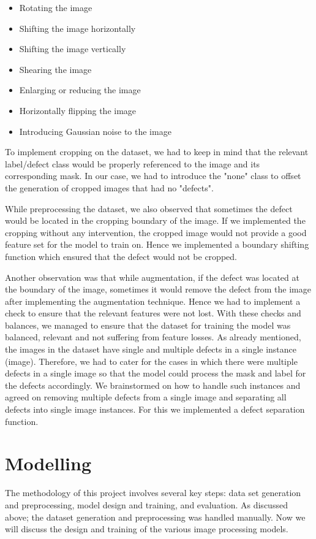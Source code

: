 \documentclass[12pt]{article}
\begin{document}
\begin{itemize}
    \item Rotating the image 
    \item Shifting the image horizontally  
    \item Shifting the image vertically  
    \item Shearing the image
    \item Enlarging or reducing  the image
    \item Horizontally flipping the image 
    \item Introducing Gaussian noise to the image
\end{itemize}

To implement cropping on the dataset, we had to keep in mind that the relevant label/defect class would be properly referenced to the image and its corresponding mask. In our case, we had to introduce the "none" class to offset the generation of cropped images that had no "defects".

While preprocessing the dataset, we also observed that sometimes the defect would be located in the cropping boundary of the image. If we implemented the cropping without any intervention, the cropped image would not provide a good feature set for the model to train on. Hence we implemented a boundary shifting function which ensured that the defect would not be cropped.

Another observation was that while augmentation, if the defect was located at the boundary of the image, sometimes it would remove the defect from the image after implementing the augmentation
technique. Hence we had to implement a check to ensure that the relevant features were not lost. With these checks and balances, we managed to ensure that the dataset for training the model was balanced, relevant and not suffering from feature losses.
As already mentioned, the images in the dataset have single and multiple defects in a single instance (image). Therefore, we had to cater for the cases in which there were multiple defects in a single image so that the model could process the mask and label for the defects accordingly. We brainstormed on how to handle such instances and agreed on removing multiple defects from a single image and separating all defects into single image instances. For this we implemented a defect separation function.

\clearpage
\newpage

\section{Modelling}
The methodology of this project involves several key steps: data set generation and preprocessing, model design and training, and evaluation. As discussed above; the dataset generation and preprocessing was handled manually. Now we will discuss the design and training of the various image processing models.
\end{document}
